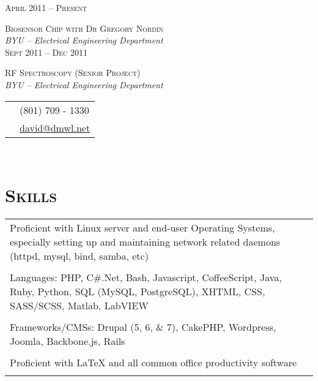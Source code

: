 \documentclass[10pt]{article}
\begin{document}
{\begin{minipage}[t]{0.5\textwidth}
	\raggedleft
	\textsc{\normalsize April 2011 -- Present}\par

	\raggedright\large \textsc{Biosensor Chip with Dr Gregory Nordin}\\
  \emph{BYU -- Electrical Engineering Department}\\[5pt]


	\raggedleft
	\textsc{\normalsize Sept 2011 -- Dec 2011}\par

	\raggedright\large \textsc{RF Spectroscopy (Senior Project)}\\
  \emph{BYU -- Electrical Engineering Department}\\[5pt]


\end{minipage} %
\hfill
\begin{minipage}[t]{0.44\textwidth} %
	
	\vspace{0pt} %
	
\colorbox{shade}{\textcolor{text1}{
	\begin{tabular}{c|p{7cm}}
		\raisebox{-3pt}{\Phone}  		&(801) 709 - 1330\\
		\raisebox{-3pt}{\Envelope} 	&\href{mailto:david@dmwl.net}
								{david@dmwl.net}
	\end{tabular}
	}
}\\[10pt]

\section{\textsc{Skills}}

	\begin{tabular}{p{8cm}}
    Proficient with Linux server and end-user Operating Systems, especially setting up and maintaining network related daemons (httpd, mysql, bind, samba, etc)\\\\
      Languages: PHP, C\#.Net, Bash, Javascript, CoffeeScript, Java, Ruby, Python, SQL (MySQL, PostgreSQL), XHTML, CSS, SASS/SCSS, Matlab, LabVIEW\\\\
    Frameworks/CMSs: Drupal (5, 6, \& 7), CakePHP, Wordpress, Joomla, Backbone.js, Rails\\\\
    Proficient with \LaTeX{} and all common office productivity software\\\\
	\end{tabular}
	

\end{minipage}}
\end{document}
